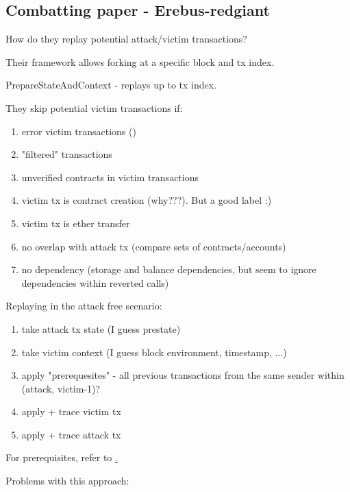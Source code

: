 \documentclass[draft,final]{vutinfth} %
\begin{document}
\subsection{Combatting paper - Erebus-redgiant}

How do they replay potential attack/victim transactions?

Their framework allows forking at a specific block and tx index.

PrepareStateAndContext - replays up to tx index.


They skip potential victim transactions if:

\begin{enumerate}
    \item error victim transactions ()
    \item "filtered" transactions 
    \item unverified contracts in victim transactions
    \item victim tx is contract creation (why???). But a good label :)
    \item victim tx is ether transfer
    \item no overlap with attack tx (compare sets of contracts/accounts)
    \item no dependency (storage and balance dependencies, but seem to ignore dependencies within reverted calls)
\end{enumerate}

Replaying in the attack free scenario:

\begin{enumerate}
    \item take attack tx state (I guess prestate)
    \item take victim context (I guess block environment, timestamp, ...)
    \item apply "prerequesites" - all previous transactions from the same sender within (attack, victim-1)?
    \item apply + trace victim tx
    \item apply + trace attack tx
\end{enumerate}

For prerequisites, refer to \href{https://github.com/Troublor/erebus-redgiant/blob/4544163f0c6a369b35c3237851f482d240fa7bbd/dataset/tx_history_test.go#L42-L53}.

Problems with this approach:
\end{document}
